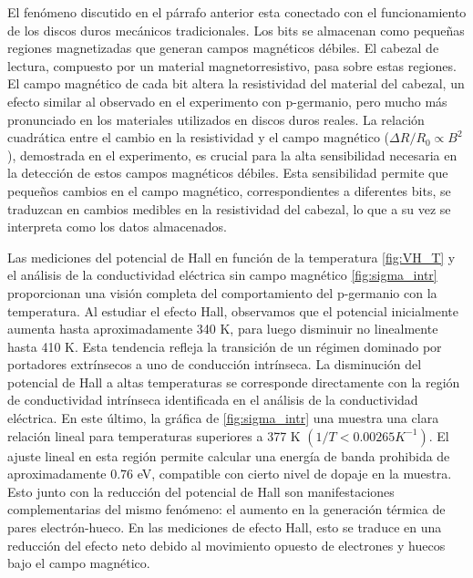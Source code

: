 	\vspace{\baselineskip} 

	El fenómeno discutido en el párrafo anterior esta conectado con el funcionamiento de los discos duros mecánicos tradicionales. Los bits se almacenan como pequeñas regiones magnetizadas que generan campos magnéticos débiles. El cabezal de lectura, compuesto por un material magnetorresistivo, pasa sobre estas regiones. El campo magnético de cada bit altera la resistividad del material del cabezal, un efecto similar al observado en el experimento con p-germanio, pero mucho más pronunciado en los materiales utilizados en discos duros reales. La relación cuadrática entre el cambio en la resistividad y el campo magnético ($\Delta R/R_0 \propto B^2$), demostrada en el experimento, es crucial para la alta sensibilidad necesaria en la detección de estos campos magnéticos débiles. Esta sensibilidad permite que pequeños cambios en el campo magnético, correspondientes a diferentes bits, se traduzcan en cambios medibles en la resistividad del cabezal, lo que a su vez se interpreta como los datos almacenados.
	
	\vspace{\baselineskip}
	
	Las mediciones del potencial de Hall en función de la temperatura \ref{fig:VH_T} y el análisis de la conductividad eléctrica sin campo magnético \ref{fig:sigma_intr} proporcionan una visión completa del comportamiento del p-germanio con la temperatura. Al estudiar el efecto Hall, observamos que el potencial inicialmente aumenta hasta aproximadamente 340 K, para luego disminuir no linealmente hasta 410 K. Esta tendencia refleja la transición de un régimen dominado por portadores extrínsecos a uno de conducción intrínseca. La disminución del potencial de Hall a altas temperaturas se corresponde directamente con la región de conductividad intrínseca identificada en el análisis de la conductividad eléctrica. En este último, la gráfica de \ref{fig:sigma_intr} una muestra una clara relación lineal para temperaturas superiores a 377 K $(1/T < 0.00265 K^{-1})$. El ajuste lineal en esta región permite calcular una energía de banda prohibida de aproximadamente 0.76 eV, compatible con cierto nivel de dopaje en la muestra. Esto junto con la reducción del potencial de Hall son manifestaciones complementarias del mismo fenómeno: el aumento en la generación térmica de pares electrón-hueco. En las mediciones de efecto Hall, esto se traduce en una reducción del efecto neto debido al movimiento opuesto de electrones y huecos bajo el campo magnético. 



